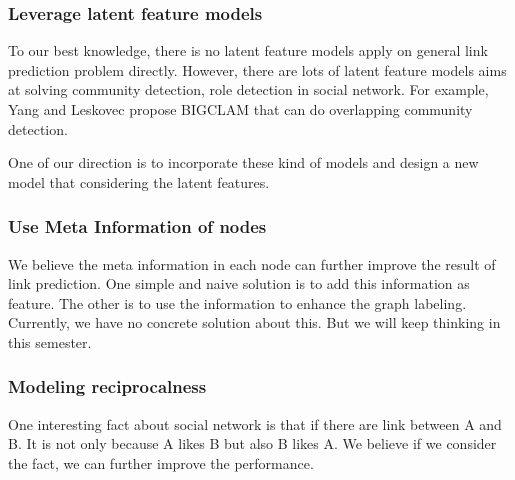 \documentclass[paper=letter, fontsize=12pt]{scrartcl} %
\begin{document}
\subsubsection {Leverage latent feature models}
To our best knowledge, there is no latent feature models apply on general link prediction problem directly. However, there are lots of latent feature models aims at solving community detection, role detection in social network. For example, Yang and Leskovec \cite{bigclam} propose BIGCLAM that can do overlapping community detection. 

One of our direction is to incorporate these kind of models and design a new model that considering the latent features. 

\subsubsection {Use Meta Information of nodes}
We believe the meta information in each node can further improve the result of link prediction. One simple and naive solution is to add this information as feature. The other is to use the information to enhance the graph labeling. Currently, we have no concrete solution about this. But we will keep thinking in this semester.

\subsubsection {Modeling reciprocalness}
One interesting fact about social network is that if there are link between A and B. It is not only because A likes B but also B likes A. We believe if we consider the fact, we can further improve the performance.





\end{document}
